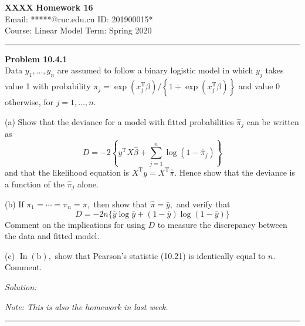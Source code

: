 \documentclass[a4paper, 11pt]{article}
\newenvironment{problem}[2][Problem]
    { \begin{mdframed}[backgroundcolor=gray!20] \textbf{#1 #2} \\}
    {  \end{mdframed}}
\newenvironment{solution}
    {\textit{Solution:}}
    {}
\begin{document}
\noindent
\large\textbf{XXXX} \hfill \textbf{Homework 16}   \\
Email: *****@ruc.edu.cn \hfill ID: 201900015* \\
\normalsize Course: Linear Model   \hfill Term: Spring 2020\\
\noindent\rule{7in}{2.8pt}


\begin{problem}{10.4.1}
Data $y_{1}, \ldots, y_{n}$ are assumed to follow a binary logistic model in which $y_{j}$ takes value 1 with probability $\pi_{j}=\exp \left(x_{j}^{\mathrm{T}} \beta\right) /\left\{1+\exp \left(x_{j}^{\mathrm{T}} \beta\right)\right\}$ and value 0 otherwise, for $j=1, \ldots, n$.

(a) Show that the deviance for a model with fitted probabilities $\widehat{\pi}_{j}$ can be written as
\[
D=-2\left\{y^{\mathrm{T}} X \widehat{\beta}+\sum_{j=1}^{n} \log \left(1-\widehat{\pi}_{j}\right)\right\}
\]
and that the likelihood equation is $X^{\mathrm{T}} y=X^{\mathrm{T}} \widehat{\pi} .$ Hence show that the deviance is a function of the $\widehat{\pi}_{j}$ alone.

(b) If $\pi_{1}=\cdots=\pi_{n}=\pi,$ then show that $\widehat{\pi}=\bar{y},$ and verify that
\[
D=-2 n\{\bar{y} \log \bar{y}+(1-\bar{y}) \log (1-\bar{y})\}
\]
Comment on the implications for using $D$ to measure the discrepancy between the data and fitted model.

(c) $\operatorname{In}(\mathrm{b}),$ show that Pearson's statistic (10.21) is identically equal to $n .$ Comment.

\end{problem}
\begin{solution}
	
	\textit{Note: This is also the homework in last week.}
	
\end{solution}

\noindent\rule{7in}{2.8pt}
\end{document}
